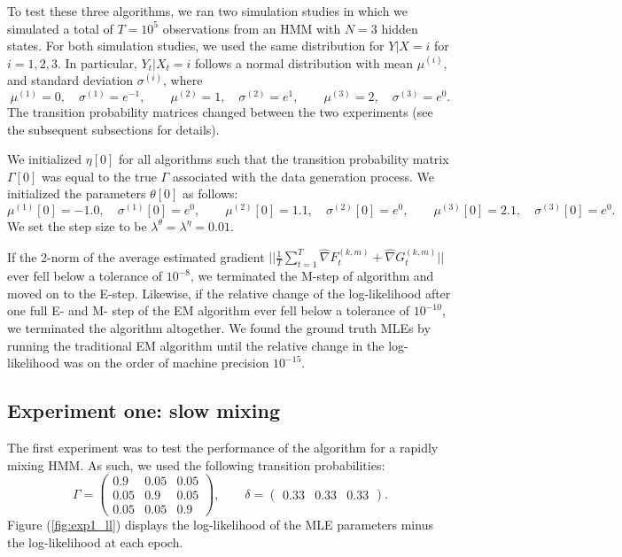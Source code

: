 To test these three algorithms, we ran two simulation studies in which we simulated a total of $T = 10^{5}$ observations from an HMM with $N = 3$ hidden states. For both simulation studies, we used the same distribution for $Y | X = i$ for $i = 1,2,3$. In particular, $Y_t | X_t = i$ follows a normal distribution with mean $\mu^{(i)}$, and standard deviation $\sigma^{(i)}$, where
%
\begin{equation*}
    \mu^{(1)} = 0, \quad \sigma^{(1)} = e^{-1}, \qquad
    \mu^{(2)} = 1, \quad \sigma^{(2)} = e^{1}, \qquad
    \mu^{(3)} = 2, \quad \sigma^{(3)} = e^{0}.
\end{equation*}
%
The transition probability matrices changed between the two experiments (see the subsequent subsections for details).

We initialized $\eta[0]$ for all algorithms such that the transition probability matrix $\Gamma[0]$ was equal to the true $\Gamma$ associated with the data generation process. We initialized the parameters $\theta[0]$ as follows:
%
\begin{equation*}
    \mu^{(1)}[0] = -1.0, \quad \sigma^{(1)}[0] = e^{0}, \qquad
    \mu^{(2)}[0] = 1.1, \quad \sigma^{(2)}[0] = e^{0}, \qquad
    \mu^{(3)}[0] = 2.1, \quad \sigma^{(3)}[0] = e^{0}.
\end{equation*}
%
We set the step size to be $\lambda^\theta = \lambda^\eta = 0.01$. 

If the 2-norm of the average estimated gradient $||\frac{1}{T}\sum_{t=1}^T \widehat \nabla F^{(k,m)}_t + \widehat \nabla G^{(k,m)}_t||$ ever fell below a tolerance of $10^{-8}$, we terminated the M-step of algorithm and moved on to the E-step. Likewise, if the relative change of the log-likelihood after one full E- and M- step of the EM algorithm ever fell below a tolerance of $10^{-10}$, we terminated the algorithm altogether. We found the ground truth MLEs by running the traditional EM algorithm until the relative change in the log-likelihood was on the order of machine precision $10^{-15}$.

\subsection{Experiment one: slow mixing}

The first experiment was to test the performance of the algorithm for a rapidly mixing HMM. As such, we used the following transition probabilities:
%
\begin{equation*}
    \Gamma = 
    \begin{pmatrix} 
        0.9 & 0.05 & 0.05 \\
        0.05 & 0.9 & 0.05 \\
        0.05 & 0.05 & 0.9
    \end{pmatrix},
    \qquad
    \delta = \begin{pmatrix} 0.33 & 0.33 & 0.33 \end{pmatrix}.
\end{equation*}
%
Figure (\ref{fig:exp1_ll}) displays the log-likelihood of the MLE parameters minus the log-likelihood at each epoch. 

